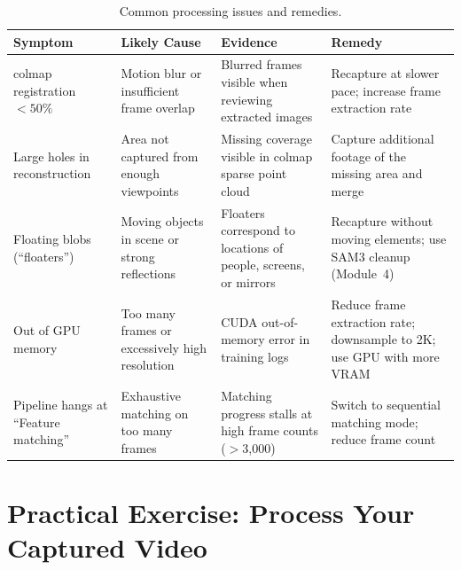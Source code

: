 \begin{table}[htbp]
  \centering
  \caption{Common processing issues and remedies.}
  \label{tab:troubleshoot}
  \begin{tabular}{@{}L{2.5cm}L{3cm}L{3cm}L{4cm}@{}}
    \toprule
    \textbf{Symptom} & \textbf{Likely Cause} & \textbf{Evidence} & \textbf{Remedy} \\
    \midrule
    \acrshort{colmap} registration $< 50\%$
      & Motion blur or insufficient frame overlap
      & Blurred frames visible when reviewing extracted images
      & Recapture at slower pace; increase frame extraction rate \\
    \addlinespace
    Large holes in reconstruction
      & Area not captured from enough viewpoints
      & Missing coverage visible in \acrshort{colmap} sparse point cloud
      & Capture additional footage of the missing area and merge \\
    \addlinespace
    Floating blobs (``floaters'')
      & Moving objects in scene or strong reflections
      & Floaters correspond to locations of people, screens, or mirrors
      & Recapture without moving elements; use SAM3 cleanup (Module~4) \\
    \addlinespace
    Out of GPU memory
      & Too many frames or excessively high resolution
      & CUDA out-of-memory error in training logs
      & Reduce frame extraction rate; downsample to 2K; use GPU with more VRAM \\
    \addlinespace
    Pipeline hangs at ``Feature matching''
      & Exhaustive matching on too many frames
      & Matching progress stalls at high frame counts ($>$3,000)
      & Switch to sequential matching mode; reduce frame count \\
    \bottomrule
  \end{tabular}
\end{table}

\section{Practical Exercise: Process Your Captured Video}
\label{sec:proc-exercise}

